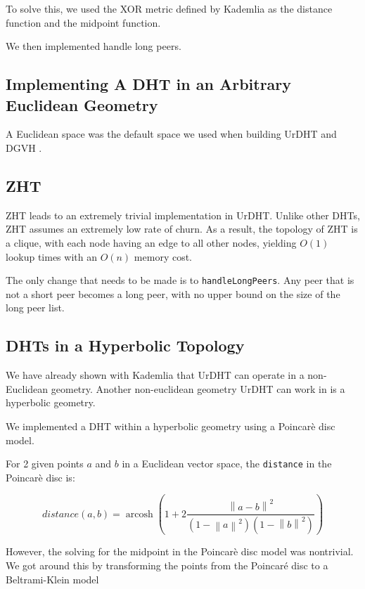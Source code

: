 \documentclass[11pt,conference]{IEEEtran}
\begin{document}
To solve this, we used the XOR metric defined by Kademlia as the distance function and the midpoint function.



We then implemented handle long peers.

\subsection{Implementing A DHT in an Arbitrary Euclidean Geometry}

A Euclidean space was the default space we used when building UrDHT and DGVH \cite{dgvh}.



\subsection{ZHT}
ZHT \cite{li2013zht} leads to an extremely trivial implementation in UrDHT.
Unlike other DHTs, ZHT assumes an extremely low rate of churn.
As a result, the topology of ZHT is a clique, with each node having an edge to all other nodes, yielding $ O(1) $ lookup times with an $ O(n) $ memory cost.

The only change that needs to be made is to \texttt{handleLongPeers}.
Any peer that is not a short peer becomes a long peer, with no upper bound on the size of the long peer list.
\subsection{DHTs in a Hyperbolic Topology}
	
\label{sec:hyper}

We have already shown with Kademlia that UrDHT can operate in a non-Euclidean geometry.
Another non-euclidean geometry UrDHT can work in is a hyperbolic geometry.

We implemented a DHT within a hyperbolic geometry using a Poincar\`{e} disc model.

For 2 given points $a$ and $b$ in a Euclidean vector space, the \texttt{distance} in the  Poincar\`{e} disc is:


\[ distance(a, b) = \operatorname{arcosh} \left(  1+ 2 \frac{ \left\| a - b \right\| ^{2} }{ ( 1 - \left\| a \right\| ^{2} ) ( 1 - \left\| b \right\| ^{2} ) }\right) \]


However, the solving for the midpoint in the Poincar\`{e} disc model was nontrivial.
We got around this by transforming the points from the Poincar\'{e} disc to a Beltrami-Klein model
\end{document}
